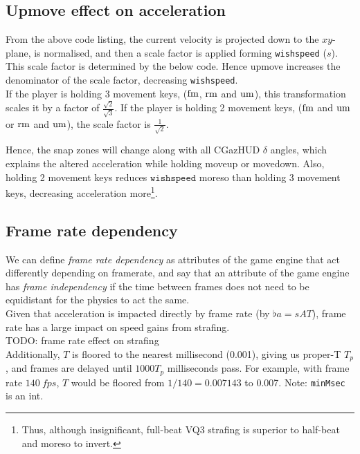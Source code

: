 \subsection{Upmove effect on acceleration}
\label{sec:upmove}
From the above code listing, the current velocity is projected down to the $xy$-plane, is normalised, and then a scale factor is applied forming \texttt{wishspeed} ($s$).
This scale factor is determined by the below code.
Hence upmove increases the denominator of the scale factor, decreasing \texttt{wishspeed}.\\
If the player is holding 3 movement keys, ($\operatorname{fm}$, $\operatorname{rm}$ and $\operatorname{um}$), this transformation scales it by a factor of $\frac{\sqrt{2}}{\sqrt{3}}$.
If the player is holding 2 movement keys, ($\operatorname{fm}$ and $\operatorname{um}$ or $\operatorname{rm}$ and $\operatorname{um}$), the scale factor is $\frac{1}{\sqrt{2}}$.

Hence, the snap zones will change along with all CGazHUD $\delta$ angles, which explains the altered acceleration while holding moveup or movedown.
Also, holding 2 movement keys reduces $\texttt{wishspeed}$ moreso than holding 3 movement keys, decreasing acceleration more\footnote{Thus, although insignificant, full-beat VQ3 strafing is superior to half-beat and moreso to invert.}.


\subsection{Frame rate dependency}
\label{sec:framerate}
We can define \emph{frame rate dependency} as attributes of the game engine that act differently depending on framerate,
and say that an attribute of the game engine has \emph{frame independency} if the time between frames does not need to be equidistant for the physics to act the same.\\

Given that acceleration is impacted directly by frame rate (by $\flat{a} = sAT$), frame rate has a large impact on speed gains from strafing.\\
TODO: frame rate effect on strafing\\

Additionally, $T$ is floored to the nearest millisecond (0.001), giving us proper-T $T_p$, and frames are delayed until $1000T_p$ milliseconds pass.
For example, with frame rate $\qty{140}{fps}$, $T$ would be floored from $1/140 = 0.007143$ to 0.007. Note: \texttt{minMsec} is an int.

